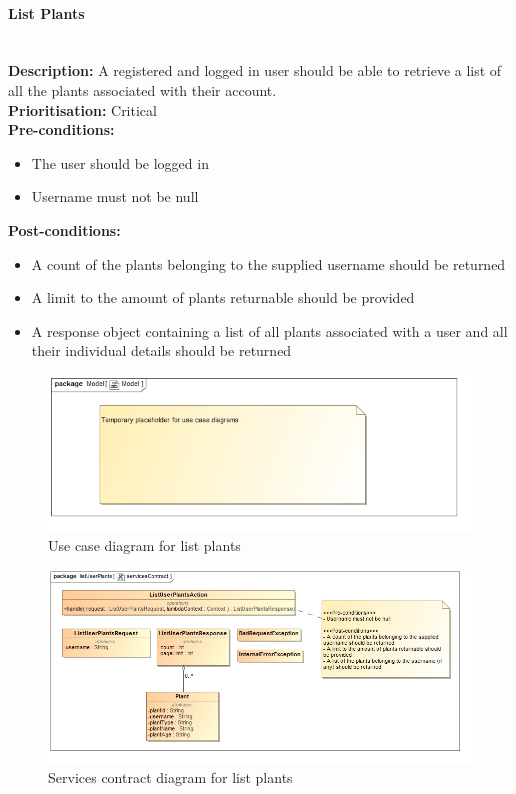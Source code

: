 \documentclass{article}
\begin{document}
	\paragraph{List Plants}\mbox{}\\
		\textbf{Description:} A registered and logged in user should be able to retrieve a list of all the plants associated with their account.\\
		\textbf{Prioritisation:} Critical\\		
		\textbf{Pre-conditions:}
			\begin{itemize}
				\item The user should be logged in
				\item Username must not be null
			\end{itemize}
		\textbf{Post-conditions:}
			\begin{itemize}
				\item A count of the plants belonging to the supplied username should be returned
				\item A limit to the amount of plants returnable should be provided
				\item A response object containing a list of all plants associated with a user and all their individual details should be returned
			\end{itemize}

		\begin{figure}[H]
			\includegraphics[width=\linewidth]{images/tempUseCase.jpg}
			\caption{Use case diagram for list plants}
		\end{figure}
		
		\begin{figure}[H]
			\includegraphics[width=\linewidth]{images/ServicesContracts/listUserPlants.jpg}
			\caption{Services contract diagram for list plants}
		\end{figure}
	
\end{document}
